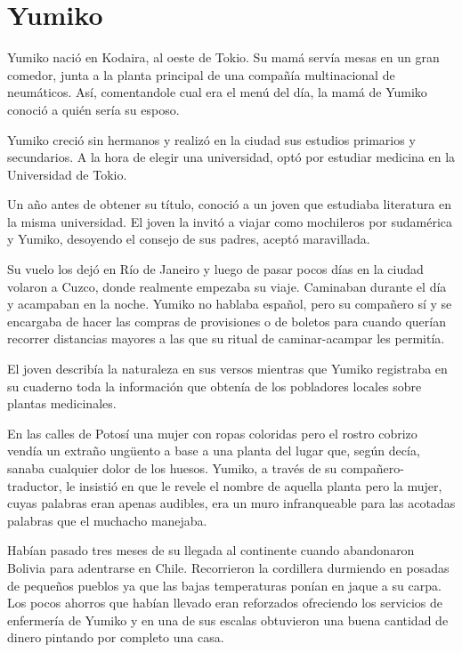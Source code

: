 \documentclass[12pt,twoside,openright]{book}
\begin{document}
\chapter*{Yumiko} 


Yumiko nació en Kodaira, al oeste de Tokio. Su mamá servía mesas en un gran comedor, junta a la planta principal de una compañía multinacional de neumáticos. Así, comentandole cual era el menú del día, la mamá de Yumiko conoció a quién sería su esposo.

Yumiko creció sin hermanos y realizó en la ciudad sus estudios primarios y secundarios. A la hora de elegir una universidad, optó por estudiar medicina en la Universidad de Tokio.

Un año antes de obtener su título, conoció a un joven que estudiaba literatura en la misma universidad. El joven la invitó a viajar como mochileros por sudamérica y Yumiko, desoyendo el consejo de sus padres, aceptó maravillada.

Su vuelo los dejó en Río de Janeiro y luego de pasar pocos días en la ciudad volaron a Cuzco, donde realmente empezaba su viaje. Caminaban durante el día y acampaban en la noche. Yumiko no hablaba español, pero su compañero sí y se encargaba de hacer las compras de provisiones o de boletos para cuando querían recorrer distancias mayores a las que su ritual de caminar-acampar les permitía.

El joven describía la naturaleza en sus versos mientras que Yumiko registraba en su cuaderno toda la información que obtenía de los pobladores locales sobre plantas medicinales.

En las calles de Potosí una mujer con ropas coloridas pero el rostro cobrizo vendía un extraño ungüento a base a una planta del lugar que, según decía, sanaba cualquier dolor de los huesos. Yumiko, a través de su compañero-traductor, le insistió en que le revele el nombre de aquella planta pero la mujer, cuyas palabras eran apenas audibles, era un muro infranqueable para las acotadas palabras que el muchacho manejaba.

Habían pasado tres meses de su llegada al continente cuando abandonaron Bolivia para adentrarse en Chile. Recorrieron la cordillera durmiendo en posadas de pequeños pueblos ya que las bajas temperaturas ponían en jaque a su carpa. Los pocos ahorros que habían llevado eran reforzados ofreciendo los servicios de enfermería de Yumiko y en una de sus escalas obtuvieron una buena cantidad de dinero pintando por completo una casa.
\end{document}
